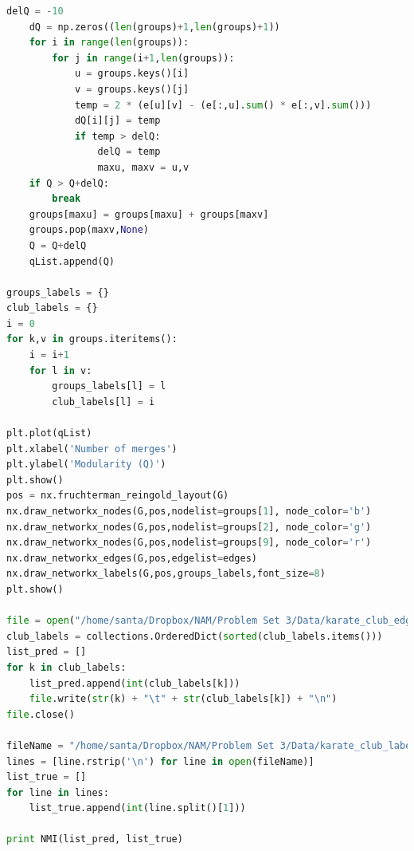 \documentclass{article}
\begin{document}
\begin{lstlisting}[language=Python, breaklines=true]
    delQ = -10
    dQ = np.zeros((len(groups)+1,len(groups)+1))
    for i in range(len(groups)):
        for j in range(i+1,len(groups)):
            u = groups.keys()[i]
            v = groups.keys()[j]
            temp = 2 * (e[u][v] - (e[:,u].sum() * e[:,v].sum()))
            dQ[i][j] = temp
            if temp > delQ:
                delQ = temp
                maxu, maxv = u,v
    if Q > Q+delQ:
        break
    groups[maxu] = groups[maxu] + groups[maxv]
    groups.pop(maxv,None)
    Q = Q+delQ
    qList.append(Q)

groups_labels = {}
club_labels = {}
i = 0
for k,v in groups.iteritems():
    i = i+1
    for l in v:
        groups_labels[l] = l
        club_labels[l] = i

plt.plot(qList)
plt.xlabel('Number of merges')
plt.ylabel('Modularity (Q)')
plt.show()
pos = nx.fruchterman_reingold_layout(G)
nx.draw_networkx_nodes(G,pos,nodelist=groups[1], node_color='b')
nx.draw_networkx_nodes(G,pos,nodelist=groups[2], node_color='g')
nx.draw_networkx_nodes(G,pos,nodelist=groups[9], node_color='r')
nx.draw_networkx_edges(G,pos,edgelist=edges)
nx.draw_networkx_labels(G,pos,groups_labels,font_size=8)
plt.show()

file = open("/home/santa/Dropbox/NAM/Problem Set 3/Data/karate_club_edges_predict.txt", "w")
club_labels = collections.OrderedDict(sorted(club_labels.items()))
list_pred = []
for k in club_labels:
    list_pred.append(int(club_labels[k]))
    file.write(str(k) + "\t" + str(club_labels[k]) + "\n")
file.close()

fileName = "/home/santa/Dropbox/NAM/Problem Set 3/Data/karate_club_labels.txt"
lines = [line.rstrip('\n') for line in open(fileName)]
list_true = []
for line in lines:
    list_true.append(int(line.split()[1]))

print NMI(list_pred, list_true)
\end{lstlisting}
\newpage
\end{document}
